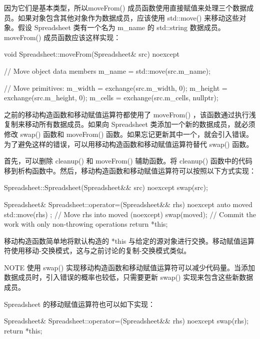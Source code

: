 
因为它们是基本类型，所以moveFrom() 成员函数使用直接赋值来处理三个数据成员。如果对象包含其他对象作为数据成员，应该使用 std::move() 来移动这些对象。假设 Spreadsheet 类有一个名为 m\_name 的 std::string 数据成员。moveFrom() 成员函数应该这样实现：

\begin{cpp}
void Spreadsheet::moveFrom(Spreadsheet& src) noexcept
{
    // Move object data members
    m_name = std::move(src.m_name);

    // Move primitives:
    m_width = exchange(src.m_width, 0);
    m_height = exchange(src.m_height, 0);
    m_cells = exchange(src.m_cells, nullptr);
}
\end{cpp}


之前的移动构造函数和移动赋值运算符都使用了 moveFrom() ，该函数通过执行浅复制来移动所有数据成员。如果向 Spreadsheet 类添加一个新的数据成员，就必须修改 swap() 函数和 moveFrom() 函数。如果忘记更新其中一个，就会引入错误。为了避免这样的错误，可以用移动构造函数和移动赋值运算符替代 swap() 函数。

首先，可以删除 cleanup() 和 moveFrom() 辅助函数。将 cleanup() 函数中的代码移到析构函数中。然后，移动构造函数和移动赋值运算符可以按照以下方式实现：

\begin{cpp}
Spreadsheet::Spreadsheet(Spreadsheet&& src) noexcept
{
    swap(src);
}

Spreadsheet& Spreadsheet::operator=(Spreadsheet&& rhs) noexcept
{
    auto moved { std::move(rhs) }; // Move rhs into moved (noexcept)
    swap(moved); // Commit the work with only non-throwing operations
    return *this;
}
\end{cpp}

移动构造函数简单地将默认构造的 *this 与给定的源对象进行交换。移动赋值运算符使用移动-交换模式，这与之前讨论的复制-交换模式类似。

\begin{myNotic}{NOTE}
使用 swap() 实现移动构造函数和移动赋值运算符可以减少代码量。当添加数据成员时，引入错误的概率也较低，只需要更新 swap() 实现来包含这些新数据成员。
\end{myNotic}

Spreadsheet 的移动赋值运算符也可以如下实现：

\begin{cpp}
Spreadsheet& Spreadsheet::operator=(Spreadsheet&& rhs) noexcept
{
    swap(rhs);
    return *this;
}
\end{cpp}

